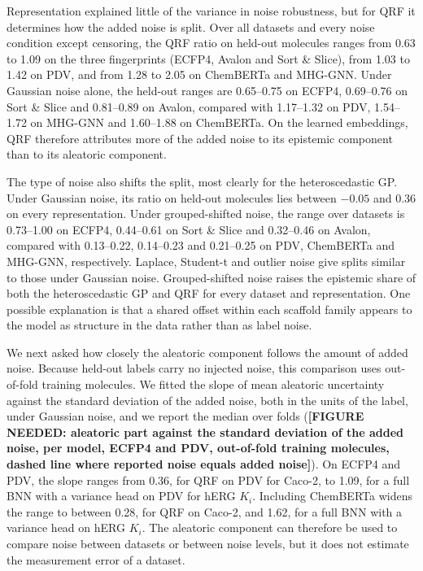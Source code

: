 Representation explained little of the variance in noise robustness, but for QRF it determines how the added noise is split. Over all datasets and every noise condition except censoring, the QRF ratio on held-out molecules ranges from 0.63 to 1.09 on the three fingerprints (ECFP4, Avalon and Sort \& Slice), from 1.03 to 1.42 on PDV, and from 1.28 to 2.05 on ChemBERTa and MHG-GNN. Under Gaussian noise alone, the held-out ranges are 0.65--0.75 on ECFP4, 0.69--0.76 on Sort \& Slice and 0.81--0.89 on Avalon, compared with 1.17--1.32 on PDV, 1.54--1.72 on MHG-GNN and 1.60--1.88 on ChemBERTa. On the learned embeddings, QRF therefore attributes more of the added noise to its epistemic component than to its aleatoric component.

The type of noise also shifts the split, most clearly for the heteroscedastic GP. Under Gaussian noise, its ratio on held-out molecules lies between $-0.05$ and 0.36 on every representation. Under grouped-shifted noise, the range over datasets is 0.73--1.00 on ECFP4, 0.44--0.61 on Sort \& Slice and 0.32--0.46 on Avalon, compared with 0.13--0.22, 0.14--0.23 and 0.21--0.25 on PDV, ChemBERTa and MHG-GNN, respectively. Laplace, Student-t and outlier noise give splits similar to those under Gaussian noise. Grouped-shifted noise raises the epistemic share of both the heteroscedastic GP and QRF for every dataset and representation. One possible explanation is that a shared offset within each scaffold family appears to the model as structure in the data rather than as label noise.

We next asked how closely the aleatoric component follows the amount of added noise. Because held-out labels carry no injected noise, this comparison uses out-of-fold training molecules. We fitted the slope of mean aleatoric uncertainty against the standard deviation of the added noise, both in the units of the label, under Gaussian noise, and we report the median over folds (\textbf{[FIGURE NEEDED: aleatoric part against the standard deviation of the added noise, per model, ECFP4 and PDV, out-of-fold training molecules, dashed line where reported noise equals added noise]}). On ECFP4 and PDV, the slope ranges from 0.36, for QRF on PDV for Caco-2, to 1.09, for a full BNN with a variance head on PDV for hERG $K_i$. Including ChemBERTa widens the range to between 0.28, for QRF on Caco-2, and 1.62, for a full BNN with a variance head on hERG $K_i$. The aleatoric component can therefore be used to compare noise between datasets or between noise levels, but it does not estimate the measurement error of a dataset.


